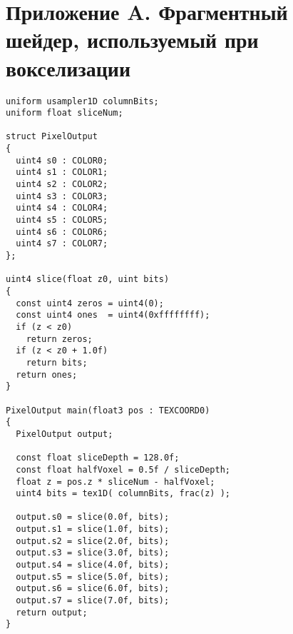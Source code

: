 \section*{Приложение A. Фрагментный шейдер, используемый при вокселизации}
\label{apx:voxelization_code}
\begin{lstlisting}[caption={Фрагментный шейдер, используемый при вокселизации}]
uniform usampler1D columnBits;
uniform float sliceNum;
          
struct PixelOutput
{
  uint4 s0 : COLOR0;
  uint4 s1 : COLOR1;
  uint4 s2 : COLOR2;
  uint4 s3 : COLOR3;
  uint4 s4 : COLOR4;
  uint4 s5 : COLOR5;
  uint4 s6 : COLOR6;
  uint4 s7 : COLOR7;
};

uint4 slice(float z0, uint bits)
{
  const uint4 zeros = uint4(0);
  const uint4 ones  = uint4(0xffffffff);
  if (z < z0)
    return zeros;
  if (z < z0 + 1.0f)
    return bits;
  return ones;
}

PixelOutput main(float3 pos : TEXCOORD0)
{
  PixelOutput output;
            
  const float sliceDepth = 128.0f;
  const float halfVoxel = 0.5f / sliceDepth;
  float z = pos.z * sliceNum - halfVoxel;
  uint4 bits = tex1D( columnBits, frac(z) );
            
  output.s0 = slice(0.0f, bits);
  output.s1 = slice(1.0f, bits);
  output.s2 = slice(2.0f, bits);
  output.s3 = slice(3.0f, bits);
  output.s4 = slice(4.0f, bits);
  output.s5 = slice(5.0f, bits);
  output.s6 = slice(6.0f, bits);
  output.s7 = slice(7.0f, bits);
  return output;
}
\end{lstlisting}
